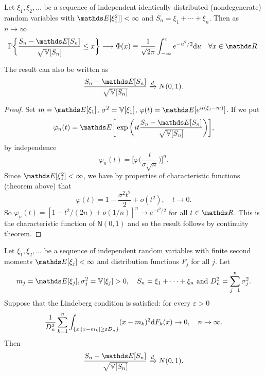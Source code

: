 \begin{theorem}
Let $\xi_1, \xi_2, \dots $ be a sequence of independent identically distributed (nondegenerate) random variables with $\E[\xi_1^2]] < \infty$ and $S_n = \xi_1 + \cdots + \xi_n$. Then as $n \to \infty$
\begin{equation*}
    \p \bigg\{ \frac{S_n - \E[S_n]}{\sqrt{\V[S_n]}} \le x \bigg\} \longrightarrow \Phi(x) \equiv \frac{1}{\sqrt{2\pi}} \int_{-\infty}^x e^{-u^2/2} \d u \quad \forall x \in \R.
\end{equation*}
\end{theorem}
\begin{remark}
The result can also be written as 
\begin{equation*}
    \frac{S_n - \E[S_n]}{\sqrt{\V[S_n]}} \xrightarrow{d} N(0,1).
\end{equation*}
\end{remark}
\begin{proof}
Set $m = \E[\xi_1]$, $\sigma^2 = \mathbb{V}[\xi_1]$, $\varphi(t) = \E[e^{it(\xi_1 - m)}]$.
If we put
\begin{equation*}
    \varphi_n(t) = \E\bigg[\exp \bigg(it \frac{S_n - \E[S_n]}{\sqrt{\V[S_n]}} \bigg)\bigg],
\end{equation*}
by independence 
\begin{equation*}
    \varphi_n(t) = \bigg[\varphi\bigg(\frac{t}{\sigma \sqrt{n}}\bigg)\bigg]^n.
\end{equation*}
Since $\E[\xi_1^2] < \infty$, we have by properties of characteristic functions (theorem above) that 
\begin{equation*}
    \varphi(t) = 1 - \frac{\sigma^2 t^2}{2} + o(t^2), \quad t \to 0.
\end{equation*}
So $\varphi_n(t) = [1 - t^2/(2n) + o(1/n)]^n \to e^{-t^2/2}$ for all $t \in \R$. This is the characteristic function of $\mathsf{N}(0,1)$ and so the result follows by continuity theorem.
\end{proof}
\begin{theorem}
Let $\xi_1, \xi_2, \dots$ be a sequence of independent random variables with finite second moments $\E[\xi_j] < \infty$ and distribution functions $F_j$ for all $j$. Let $$m_j = \E[\xi_j], \sigma_j^2 = \V[\xi_j] >0,\quad S_n = \xi_1 + \cdots + \xi_n \text{ and } D_n^2 = \sum_{j=1}^n \sigma_j^2.$$ 
Suppose that the Lindeberg condition is satisfied: for every $\varepsilon > 0$
\begin{equation*}
    \frac{1}{D_n^2}\sum_{k=1}^n \int_{\{x:|x-m_k|\ge \varepsilon D_n \}} (x-m_k)^2 \mathrm{d} F_k(x) \to 0, \quad n \to \infty.
\end{equation*}
Then 
\begin{equation*}
    \frac{S_n - \E[S_n]}{\sqrt{\V[S_n]}} \xrightarrow{d} N(0,1).
\end{equation*}
\end{theorem}
